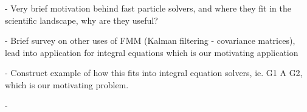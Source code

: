 - Very brief motivation behind fast particle solvers, and where they fit in the scientific landscape, why are they useful?

- Brief survey on other uses of FMM (Kalman filtering - covariance matrices), lead into application for integral equations which is our motivating application

- Construct example of how this fits into integral equation solvers, ie. G1 A  G2, which is our motivating problem.

- 
